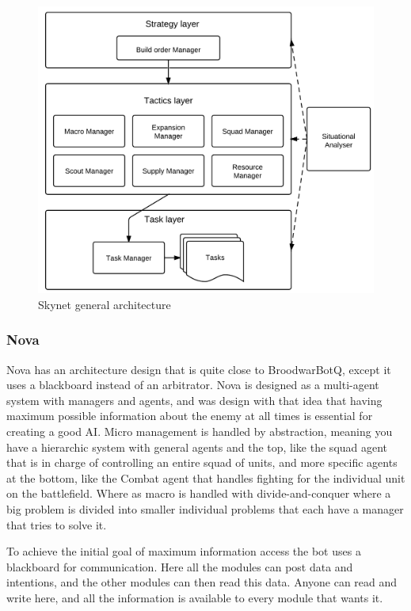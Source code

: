 \begin{figure}[h!tbp]
\centering
\includegraphics[scale=0.8]{graphics/skynet.png}
\caption{Skynet general architecture}
\label{fig:bthaiarch}
\end{figure}

\subsubsection{Nova}\cite{pérezmulti}
Nova has an architecture design that is quite close to BroodwarBotQ, except it uses a blackboard instead of an arbitrator. Nova is designed as a multi-agent system with managers and agents, and was design with that idea that having maximum possible information about the enemy at all times is essential for creating a good AI. Micro management is handled by abstraction, meaning you have a hierarchic system with general agents and the top, like the squad agent that is in charge of controlling an entire squad of units, and more specific agents at the bottom, like the Combat agent that handles fighting for the individual unit on the battlefield. Where as macro is handled with divide-and-conquer where a big problem is divided into smaller individual problems that each have a manager that tries to solve it. 

To achieve the initial goal of maximum information access the bot uses a blackboard for communication. Here all the modules can post data and intentions, and the other modules can then read this data. Anyone can read and write here, and all the information is available to every module that wants it. 

